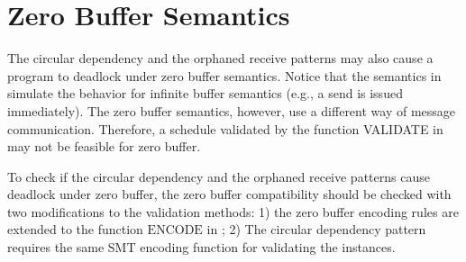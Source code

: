 \section{Zero Buffer Semantics}
The circular dependency and the orphaned receive patterns may also cause a program to deadlock under zero buffer semantics. Notice that the semantics in  simulate the behavior for infinite buffer semantics (e.g., a send is issued immediately). 
The zero buffer semantics, however, use a different way of message communication. 
Therefore, a schedule validated by the function \textrm{VALIDATE} in  may not be feasible for zero buffer. 

To check if the circular dependency and the orphaned receive patterns cause deadlock under zero buffer, the zero buffer compatibility \cite{HuangNFM15} should be checked with two modifications to the validation methods: 1) the zero buffer encoding rules \cite{HuangNFM15} are extended to the function $\mathrm{ENCODE}$ in ; 2) The circular dependency pattern requires the same SMT encoding function for validating the instances. 
